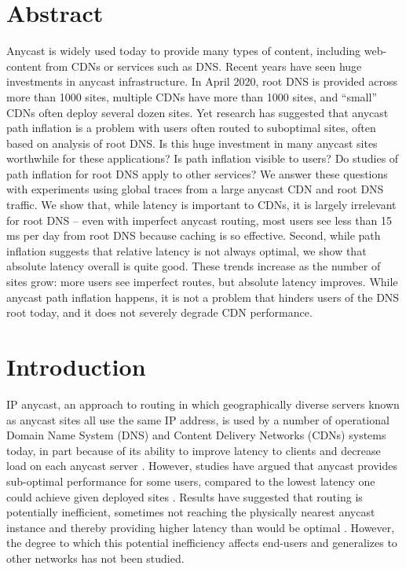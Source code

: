 \documentclass[sigconf,letterpaper,nonacm,10pt,anonymous]{acmart}
\begin{document}
\fi

\section*{Abstract}\label{abstract}

Anycast is widely used today to provide many types of content, including
web-content from CDNs or services such as DNS. Recent years have seen
huge investments in anycast infrastructure. In April 2020, root DNS is
provided across more than 1000 sites, multiple CDNs have more than 1000
sites, and ``small'' CDNs often deploy several dozen sites. Yet research
has suggested that anycast path inflation is a problem with users often
routed to suboptimal sites, often based on analysis of root DNS. Is this
huge investment in many anycast sites worthwhile for these applications?
Is path inflation visible to users? Do studies of path inflation for
root DNS apply to other services? We answer these questions with
experiments using global traces from a large anycast CDN and root DNS
traffic. We show that, while latency is important to CDNs, it is largely
irrelevant for root DNS -- even with imperfect anycast routing, most
users see less than 15 ms per day from root DNS because caching is so
effective. Second, while path inflation suggests that relative latency
is not always optimal, we show that absolute latency overall is quite
good. These trends increase as the number of sites grow: more users see
imperfect routes, but absolute latency improves. While anycast path
inflation happens, it is not a problem that hinders users of the DNS
root today, and it does not severely degrade CDN performance.

\section{Introduction}\label{introduction-1}

\label{sec:introduction}

IP anycast, an approach to routing in which geographically diverse
servers known as anycast sites all use the same IP address, is used by a
number of operational Domain Name System (DNS)
\cite{root_servers, cloudflare_anycast, akamai_anycast, route53_anycast, google_public_dns}
and Content Delivery Networks (CDNs)
\cite{calder2015analyzing,edgecast_anycast,amazon_cloudfront} systems
today, in part because of its ability to improve latency to clients and
decrease load on each anycast server
\cite{katabi2000framework,metz2002ip,rfc_1546}. However, studies have
argued that anycast provides sub-optimal performance for some users,
compared to the lowest latency one could achieve given deployed sites
\cite{sarat2006use, calder2015analyzing, li_levin_spring_bhattacharjee_2018, huawei_evaluating_anycast, mcquistin2019taming}.
Results have suggested that routing is potentially inefficient,
sometimes not reaching the physically nearest anycast instance and
thereby providing higher latency than would be optimal
\cite{sarat2006use,liang2013measuring,li_levin_spring_bhattacharjee_2018}.
However, the degree to which this potential inefficiency affects
end-users and generalizes to other networks has not been studied.
\end{document}

